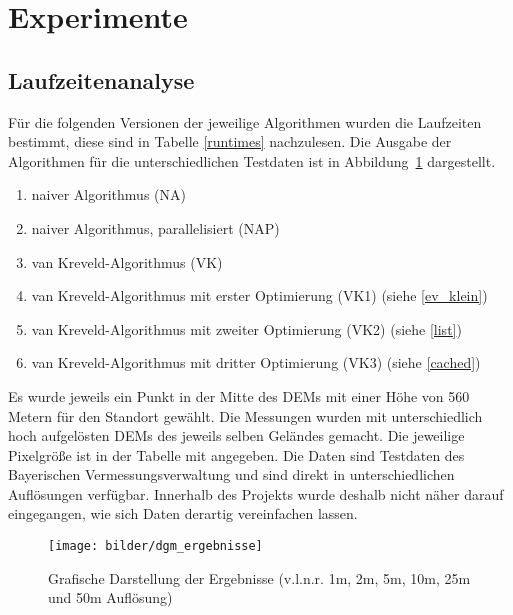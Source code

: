 \section{Experimente}
\label{exp}

\subsection{Laufzeitenanalyse}

Für die folgenden Versionen der jeweilige Algorithmen wurden die Laufzeiten bestimmt, diese sind in Tabelle \ref{runtimes} nachzulesen. 
Die Ausgabe der Algorithmen für die unterschiedlichen Testdaten ist in Abbildung~\ref{dgm_erg} dargestellt. 

\begin{enumerate}
 \item naiver Algorithmus (NA)
 \item naiver Algorithmus, parallelisiert (NAP)
 \item van Kreveld-Algorithmus (VK)
 \item van Kreveld-Algorithmus mit erster Optimierung (VK1) (siehe \ref{ev_klein})
 \item van Kreveld-Algorithmus mit zweiter Optimierung (VK2) (siehe \ref{list})
 \item van Kreveld-Algorithmus mit dritter Optimierung (VK3) (siehe \ref{cached})
\end{enumerate}

Es wurde jeweils ein Punkt in der Mitte des DEMs mit einer Höhe von 560 Metern für den Standort gewählt. 
Die Messungen wurden mit unterschiedlich hoch aufgelösten DEMs des jeweils selben Geländes gemacht. Die jeweilige Pixelgröße ist in der Tabelle mit angegeben. 
Die Daten sind Testdaten des Bayerischen Vermessungsverwaltung \cite{berchtesgaden} und sind direkt in unterschiedlichen Auflösungen verfügbar. 
Innerhalb des Projekts wurde deshalb nicht näher darauf eingegangen, wie sich Daten derartig vereinfachen lassen. 

\begin{figure}[!ht]
 \centering
 \texttt{[image: bilder/dgm\_ergebnisse]}
 \caption{Grafische Darstellung der Ergebnisse \newline(v.l.n.r. 1m, 2m, 5m, 10m, 25m und 50m Auflösung)}
 \label{dgm_erg}
\end{figure}

